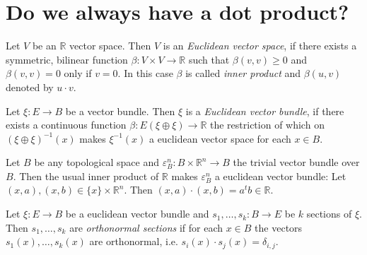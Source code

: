 \section{Do we always have a dot product?}
\begin{definition} Let $V$ be an $\mathbb{R}$ vector space. Then $V$ is an \emph{Euclidean vector space}, if there exists a symmetric, bilinear function $\beta:V\times V\to\mathbb{R}$ such that $\beta(v,v)\geq0$ and $\beta(v,v)=0$ only if $v=0$. In this case $\beta$ is called \emph{inner product} and $\beta(u,v)$ denoted by $u\cdot v$.
\end{definition}

\begin{definition} Let $\xi:E\to B$ be a vector bundle. Then $\xi$ is a \emph{Euclidean vector bundle}, if there exists a continuous function $\beta:E(\xi\oplus\xi)\to\mathbb{R}$ the restriction of which on $(\xi\oplus\xi)^{-1}(x)$ makes $\xi^{-1}(x)$ a euclidean vector space for each $x\in B$.
\end{definition}

\begin{example} Let $B$ be any topological space and $\varepsilon_B^n:B\times\mathbb{R}^n\to B$ the trivial vector bundle over $B$. Then the usual inner product of $\mathbb{R}$ makes $\varepsilon_B^n$ a euclidean vector bundle: Let $(x,a),(x,b)\in\{x\}\times\mathbb{R}^n$. Then $(x,a)\cdot(x,b)=a^tb\in\mathbb{R}$.
\end{example}

\begin{definition} Let $\xi:E\to B$ be a euclidean vector bundle and $s_1,\ldots,s_k:B\to E$ be $k$ sections of $\xi$. Then $s_1,\ldots,s_k$ are \emph{orthonormal sections} if for each $x\in B$ the vectors $s_1(x),\ldots,s_k(x)$ are orthonormal, i.e. $s_i(x)\cdot s_j(x)=\delta_{i,j}$.
\end{definition}

